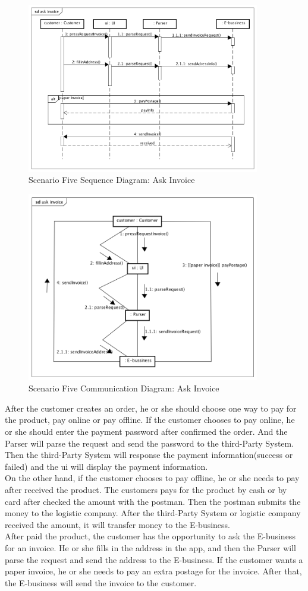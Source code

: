 \documentclass[12pt]{scrreprt}
\begin{document}
\begin{figure}[H]
  \centering\includegraphics[width=4in]{DocumentRes/5SequenceDiagram_askInvoice.png}
  \caption{Scenario Five Sequence Diagram: Ask Invoice}
\end{figure}
\begin{figure}[H]
  \centering\includegraphics[width=4in]{DocumentRes/5CommunicationDiagram_askInvoice.png}
  \caption{Scenario Five Communication Diagram: Ask Invoice}
\end{figure}
After the customer creates an order, he or she should choose one way to pay for
the product, pay online or pay offline. If the customer chooses to pay online,
he or she should enter the payment password after confirmed  the order. And the
Parser will parse the request and send the password to the third-Party System.
Then the third-Party System will response the payment information(success or
failed) and the ui will display the payment information.\\
On the other hand, if the customer chooses to pay offline, he or she needs to
pay after received the product. The customers pays for the product by cash or by
card after checked the amount with the postman. Then the postman submits the
money to the logistic company. After the third-Party System or logistic company
received the amount, it will transfer money to the E-business.\\
After paid the product, the customer has the opportunity to ask the E-business
for an invoice. He or she fills in the address in the app, and then the Parser
will parse the request and send the address to the E-business. If the customer
wants a paper invoice, he or she needs to pay an extra postage for the invoice.
After that, the E-business will send the invoice to the customer.
\end{document}
